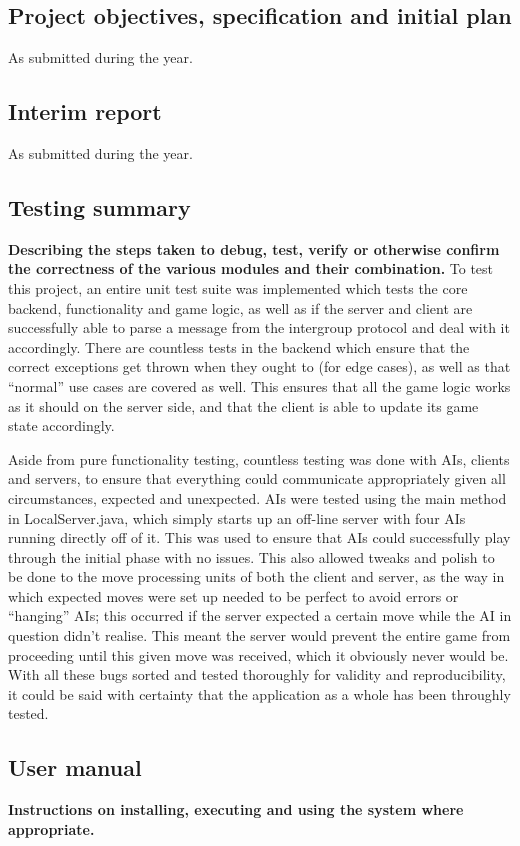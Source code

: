 \documentclass[a4paper,doc,draftfirst]{apa6}
\begin{document}
\begin{appendices}

\subsection{Project objectives, specification and initial plan}
As submitted during the year.




\subsection{Interim report}
As submitted during the year.




\subsection{Testing summary}
\textbf{Describing the steps taken to debug, test, verify or otherwise confirm the correctness of the various modules and their combination.}
To test this project, an entire unit test suite was implemented which tests the core backend, functionality and game logic, as well as if the server and client are successfully able to parse a message from the intergroup protocol and deal with it accordingly. There are countless tests in the backend which ensure that the correct exceptions get thrown when they ought to (for edge cases), as well as that “normal” use cases are covered as well. This ensures that all the game logic works as it should on the server side, and that the client is able to update its game state accordingly.

Aside from pure functionality testing, countless testing was done with AIs, clients and servers, to ensure that everything could communicate appropriately given all circumstances, expected and unexpected. AIs were tested using the main method in LocalServer.java, which simply starts up an off-line server with four AIs running directly off of it. This was used to ensure that AIs could successfully play through the initial phase with no issues. This also allowed tweaks and polish to be done to the move processing units of both the client and server, as the way in which expected moves were set up needed to be perfect to avoid errors or “hanging” AIs; this occurred if the server expected a certain move while the AI in question didn’t realise. This meant the server would prevent the entire game from proceeding until this given move was received, which it obviously never would be. With all these bugs sorted and tested thoroughly for validity and reproducibility, it could be said with certainty that the application as a whole has been throughly tested.



\subsection{User manual}
\textbf{Instructions on installing, executing and using the system where appropriate.}

\lipsum[100-105]

\end{appendices}



\printbibliography
\end{document}
